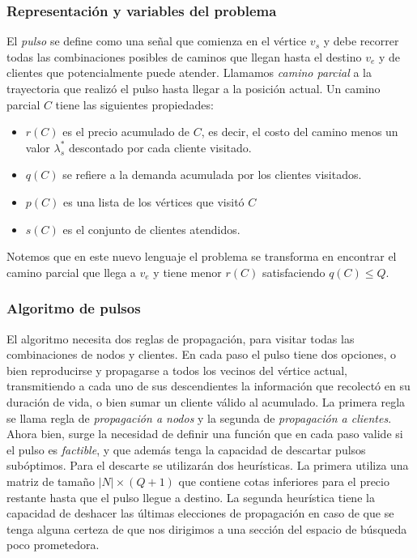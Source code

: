 \subsubsection{Representación y variables del problema}

El \emph{pulso} se define como una señal que comienza en el vértice $v_s$ y debe recorrer todas las combinaciones posibles de caminos que llegan hasta el destino $v_e$ y de clientes que potencialmente puede atender. Llamamos \emph{camino parcial} a la trayectoria que realizó el pulso hasta llegar a la posición actual. Un camino parcial $C$ tiene las siguientes propiedades:

\begin{itemize}
    \item $r(C)$ es el precio acumulado de $C$, es decir, el costo del camino menos un valor $\lambda^{*}_s$ descontado por cada cliente visitado.
    \item $q(C)$ se refiere a la demanda acumulada por los clientes visitados.
    \item $p(C)$ es una lista de los vértices que visitó $C$
    \item $s(C)$ es el conjunto de clientes atendidos.
\end{itemize}

Notemos que en este nuevo lenguaje el problema se transforma en encontrar el camino parcial que llega a $v_e$ y tiene menor $r(C)$ satisfaciendo $q(C) \leq Q$.


\subsubsection{Algoritmo de pulsos}

El algoritmo necesita dos reglas de propagación, para visitar todas las combinaciones de nodos y clientes. En cada paso el pulso tiene dos opciones, o bien reproducirse y propagarse a todos los vecinos del vértice actual, transmitiendo a cada uno de sus descendientes la información que recolectó en su duración de vida, o bien sumar un cliente válido al acumulado. La primera regla se llama regla de \emph{propagación a nodos} y la segunda de \emph{propagación a clientes}. Ahora bien, surge la necesidad de definir una función que en cada paso valide si el pulso es \emph{factible}, y que además tenga la capacidad de descartar pulsos subóptimos. Para el descarte se utilizarán dos heurísticas. La primera utiliza una matriz de tamaño $|N| \times (Q+1)$ que contiene cotas inferiores para el precio restante hasta que el pulso llegue a destino. La segunda heurística tiene la capacidad de deshacer las últimas elecciones de propagación en caso de que se tenga alguna certeza de que nos dirigimos a una sección del espacio de búsqueda poco prometedora.

